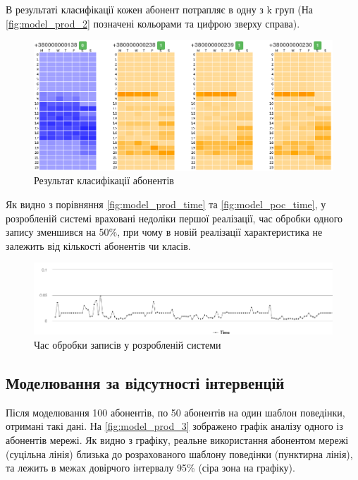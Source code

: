 В результаті класифікації кожен абонент потрапляє в одну з k груп (На \autoref{fig:model_prod_2} позначені кольорами та цифрою зверху справа).

\begin{figure}[h!]
        \begin{center}
            \includegraphics[scale=0.4]{resources/model_2_2.png}
        \end{center}
        \caption{Результат класифікації абонентів}
        \label{fig:model_prod_2}
\end{figure}

Як видно з порівняння \autoref{fig:model_prod_time} та \autoref{fig:model_poc_time}, у розробленій системі враховані недоліки першої реалізації, час обробки одного запису зменшився на 50\%, при чому в новій реалізації характеристика не залежить від кількості абонентів чи класів.

\begin{figure}[h!]
        \begin{center}
            \includegraphics[scale=0.5]{resources/system-time.png}
        \end{center}
        \caption{Час обробки записів у розробленій системи}
        \label{fig:model_prod_time}
\end{figure}

\subsection{Моделювання за відсутності інтервенцій}

Після моделювання 100 абонентів, по 50 абонентів на один шаблон поведінки, отримані такі дані. На \autoref{fig:model_prod_3} зображено графік аналізу одного із абонентів мережі. Як видно з графіку, реальне використання абонентом мережі (суцільна лінія) близька до розрахованого шаблону поведінки (пунктирна лінія), та лежить в межах довірчого інтервалу 95\% (сіра зона на графіку).

